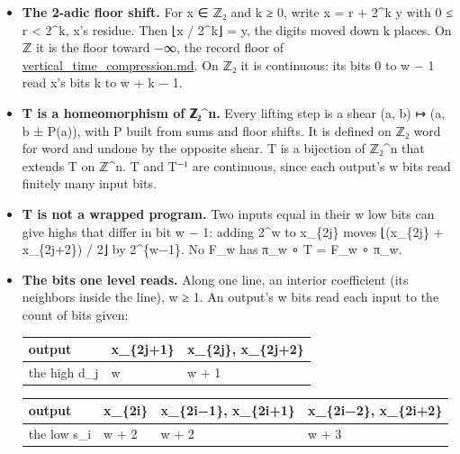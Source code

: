\begin{itemize}
\item \textbf{The 2-adic floor shift.} For x ∈ ℤ₂ and k ≥ 0, write x = r + 2\textasciicircum{}k y with 0 ≤ r < 2\textasciicircum{}k, x's residue. Then ⌊x / 2\textasciicircum{}k⌋ = y, the digits moved down k places. On ℤ it is the floor toward −∞, the record floor of \hyperref[chap:vertical-time-compression]{vertical\_\allowbreak{}time\_\allowbreak{}compression.md}. On ℤ₂ it is continuous: its bits 0 to w − 1 read x's bits k to w + k − 1.
\item \textbf{T is a homeomorphism of ℤ₂\textasciicircum{}n.} Every lifting step is a shear (a, b) ↦ (a, b ± P(a)), with P built from sums and floor shifts. It is defined on ℤ₂ word for word and undone by the opposite shear. T is a bijection of ℤ₂\textasciicircum{}n that extends T on ℤ\textasciicircum{}n. T and T⁻¹ are continuous, since each output's w bits read finitely many input bits.
\item \textbf{T is not a wrapped program.} Two inputs equal in their w low bits can give highs that differ in bit w − 1: adding 2\textasciicircum{}w to x\_\allowbreak{}\{2j\} moves ⌊(x\_\allowbreak{}\{2j\} + x\_\allowbreak{}\{2j+2\}) / 2⌋ by 2\textasciicircum{}\{w−1\}. No F\_\allowbreak{}w has π\_\allowbreak{}w ∘ T = F\_\allowbreak{}w ∘ π\_\allowbreak{}w.
\item \textbf{The bits one level reads.} Along one line, an interior coefficient (its neighbors inside the line), w ≥ 1. An output's w bits read each input to the count of bits given:

{\small
\setlength{\tabcolsep}{6pt}
\begin{longtable}{>{\RaggedRight\arraybackslash}p{}>{\RaggedRight\arraybackslash}p{}>{\RaggedRight\arraybackslash}p{}}
\toprule
output & x\_\allowbreak{}\{2j+1\} & x\_\allowbreak{}\{2j\}, x\_\allowbreak{}\{2j+2\} \\
\midrule
\endhead
the high d\_\allowbreak{}j & w & w + 1 \\
\bottomrule
\end{longtable}
}

{\footnotesize
\setlength{\tabcolsep}{6pt}
\begin{longtable}{>{\RaggedRight\arraybackslash}p{}>{\RaggedRight\arraybackslash}p{}>{\RaggedRight\arraybackslash}p{}>{\RaggedRight\arraybackslash}p{}}
\toprule
output & x\_\allowbreak{}\{2i\} & x\_\allowbreak{}\{2i−1\}, x\_\allowbreak{}\{2i+1\} & x\_\allowbreak{}\{2i−2\}, x\_\allowbreak{}\{2i+2\} \\
\midrule
\endhead
the low s\_\allowbreak{}i & w + 2 & w + 2 & w + 3 \\
\bottomrule
\end{longtable}
}


\end{itemize}
